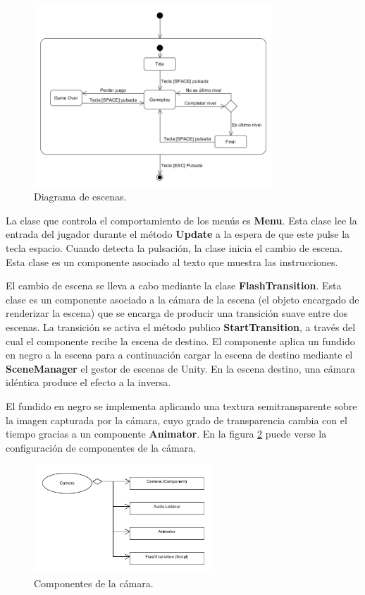 \begin{figure}[h]
    \centering
    \includegraphics[width=0.8\textwidth]{images/estructura/menu/scenes}
    \caption{Diagrama de escenas.}
    \label{diagrama_escenas}
\end{figure}

La clase que controla el comportamiento de los menús es \textbf{Menu}. Esta clase lee la entrada del jugador durante el método \textbf{Update} a la espera de que este pulse la tecla espacio. Cuando detecta la pulsación, la clase inicia el cambio de escena. Esta clase es un componente asociado al texto que muestra las instrucciones.

El cambio de escena se lleva a cabo mediante la clase \textbf{FlashTransition}. Esta clase es un componente asociado a la cámara de la escena (el objeto encargado de renderizar la escena) que se encarga de producir una transición suave entre dos escenas. La transición se activa el método publico \textbf{StartTransition}, a través del cual el componente recibe la escena de destino. El componente aplica un fundido en negro a la escena para a continuación cargar la escena de destino mediante el \textbf{SceneManager} el gestor de escenas de Unity. En la escena destino, una cámara idéntica produce el efecto a la inversa.

El fundido en negro se implementa aplicando una textura semitransparente sobre la imagen capturada por la cámara, cuyo grado de transparencia cambia con el tiempo gracias a un componente \textbf{Animator}. En la figura \ref{camara_components} puede verse la configuración de componentes de la cámara.
\begin{figure}[h]
    \centering
    \includegraphics[width=0.6\textwidth]{images/estructura/menu/camera}
    \caption{Componentes de la cámara.}
    \label{camara_components}
\end{figure}

